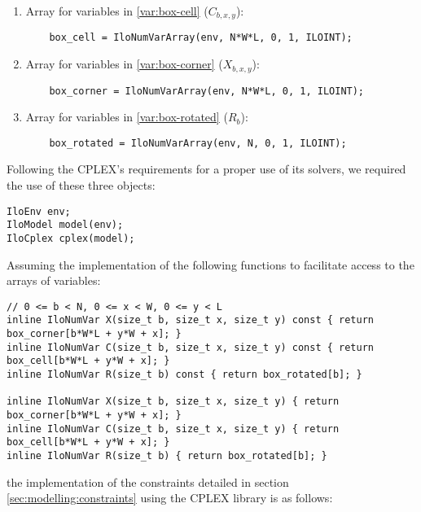 \begin{enumerate}
	\item Array for variables in \ref{var:box-cell} ($C_{b,x,y}$):
    
	{\NOINDENT \begin{lstlisting}
	box_cell = IloNumVarArray(env, N*W*L, 0, 1, ILOINT);
	\end{lstlisting}}
    
	\item Array for variables in \ref{var:box-corner} ($X_{b,x,y}$):
    
	{\NOINDENT \begin{lstlisting}
	box_corner = IloNumVarArray(env, N*W*L, 0, 1, ILOINT);
	\end{lstlisting}}
    
	\item Array for variables in \ref{var:box-rotated} ($R_b$):
    
	{\NOINDENT \begin{lstlisting}
	box_rotated = IloNumVarArray(env, N, 0, 1, ILOINT);
	\end{lstlisting}}
    
\end{enumerate}

Following the CPLEX's requirements for a proper use of its solvers, we required the
use of these three objects:

{\NOINDENT \begin{lstlisting}
IloEnv env;
IloModel model(env);
IloCplex cplex(model);
\end{lstlisting}}

Assuming the implementation of the following functions to facilitate
access to the arrays of variables:

{\NOINDENT \begin{lstlisting}
// 0 <= b < N, 0 <= x < W, 0 <= y < L
inline IloNumVar X(size_t b, size_t x, size_t y) const { return box_corner[b*W*L + y*W + x]; }
inline IloNumVar C(size_t b, size_t x, size_t y) const { return box_cell[b*W*L + y*W + x]; }
inline IloNumVar R(size_t b) const { return box_rotated[b]; }

inline IloNumVar X(size_t b, size_t x, size_t y) { return box_corner[b*W*L + y*W + x]; }
inline IloNumVar C(size_t b, size_t x, size_t y) { return box_cell[b*W*L + y*W + x]; }
inline IloNumVar R(size_t b) { return box_rotated[b]; }
\end{lstlisting}}

the implementation of the constraints detailed in section \ref{sec:modelling:constraints}
using the CPLEX library is as follows:

